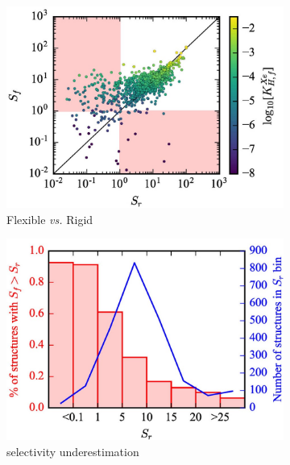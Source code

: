 \documentclass[main]{subfiles}
\begin{document}
\begin{figure}[ht]
  \centering
  \begin{subfigure}[b]{0.32\textwidth}
    \centering
    \includegraphics[width=\textwidth]{figures/6-perspectives/s_f-s_r.jpg}
    \caption{Flexible \emph{vs.} Rigid}
  \end{subfigure}
  \hfill
  \begin{subfigure}[b]{0.3\textwidth}
    \centering
    \includegraphics[width=\textwidth]{figures/6-perspectives/histogram_flex.jpg}
    \caption{selectivity underestimation}\label{fgr:underestimated_rigid}
  \end{subfigure}
  \hfill
  \begin{subfigure}[b]{0.32\textwidth}
    \centering

\end{subfigure}
\end{figure}
\end{document}
